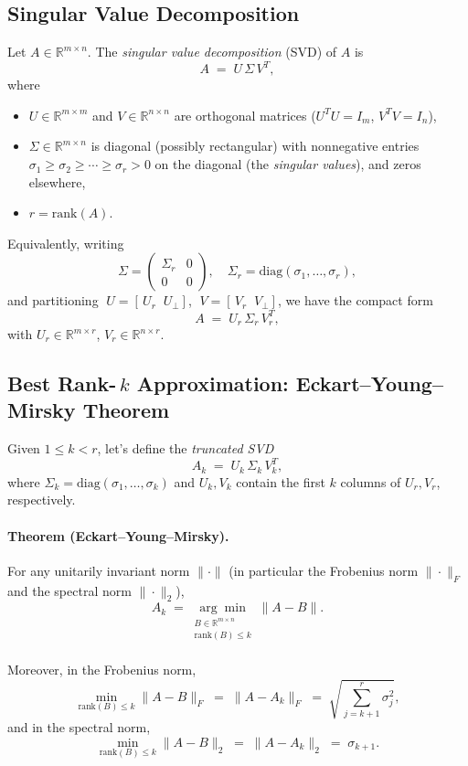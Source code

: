 \documentclass[12pt]{article}
\begin{document}
\subsection{Singular Value Decomposition}
Let \(A\in\mathbb{R}^{m\times n}\).  The \emph{singular value decomposition} (SVD) of \(A\) is
\[
A \;=\; U\,\Sigma\,V^T,
\]
\noindent where
\begin{itemize}
  \item \(U\in\mathbb{R}^{m\times m}\) and \(V\in\mathbb{R}^{n\times n}\) are orthogonal matrices (\(U^TU=I_m\), \(V^TV=I_n\)),
  \item \(\Sigma\in\mathbb{R}^{m\times n}\) is diagonal (possibly rectangular) with nonnegative entries
    \(\sigma_1\ge\sigma_2\ge\cdots\ge\sigma_r>0\) on the diagonal (the \emph{singular values}), and zeros elsewhere,
  \item \(r=\mathrm{rank}(A)\).
\end{itemize}
\noindent Equivalently, writing
\[
\Sigma = \begin{pmatrix}
\Sigma_r & 0\\[6pt]
0 & 0
\end{pmatrix},\quad
\Sigma_r = \mathrm{diag}(\sigma_1,\dots,\sigma_r),
\]
\noindent and partitioning
\(\;U=[\,U_r\;\;U_\perp]\), 
\(\;V=[\,V_r\;\;V_\perp]\), we have the compact form
\[
A \;=\; U_r\,\Sigma_r\,V_r^T,
\]
\noindent with \(U_r\in\mathbb{R}^{m\times r}\), \(V_r\in\mathbb{R}^{n\times r}\).

\subsection{Best Rank-\(\,k\) Approximation: Eckart–Young–Mirsky Theorem}
Given \(1 \le k < r\), let's define the \emph{truncated SVD}
\[
A_k \;=\; U_k\,\Sigma_k\,V_k^T,
\]
\noindent where \(\Sigma_k=\mathrm{diag}(\sigma_1,\dots,\sigma_k)\) and \(U_k,V_k\) contain the first \(k\) columns of \(U_r,V_r\), respectively.

\paragraph{Theorem (Eckart–Young–Mirsky).}
For any unitarily invariant norm \(\|\cdot\|\) (in particular the Frobenius norm \(\|\cdot\|_F\) and the spectral norm \(\|\cdot\|_2\)),
\[
A_k 
\;=\;
\underset{\substack{B\in\mathbb{R}^{m\times n}\\\mathrm{rank}(B)\le k}}{\arg\min}\;\|A - B\|.
\]
\\
\noindent Moreover, in the Frobenius norm,
\[
\min_{\mathrm{rank}(B)\le k}\|A-B\|_F
\;=\;
\|A - A_k\|_F
\;=\;
\sqrt{\sum_{j=k+1}^r \sigma_j^2},
\]
\noindent and in the spectral norm,
\[
\min_{\mathrm{rank}(B)\le k}\|A-B\|_2
\;=\;
\|A - A_k\|_2
\;=\;
\sigma_{k+1}.
\]
\end{document}
